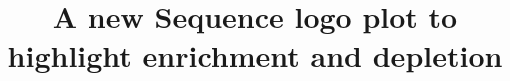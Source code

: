 \documentclass{bmcart}
\begin{document}
\begin{frontmatter}

\begin{fmbox}


\title{A new Sequence logo plot to highlight enrichment and depletion}


\author[
   addressref={aff1},                   %
   corref={aff1},                       %
   email={kkdey@uchicago.edu}   %
]{ }
\author[
   addressref={aff1},
   email={dyxie@uchicago.edu}
]{ }
\author[
   addressref={aff1, aff2},
   email={mstephens@uchicago.edu}
]{ }


\address[id=aff1]{%
  , %
  ,%
  ,                              %
}
\address[id=aff2]{%
  ,
  ,
  ,
}


\end{fmbox}
\end{frontmatter}
\end{document}
